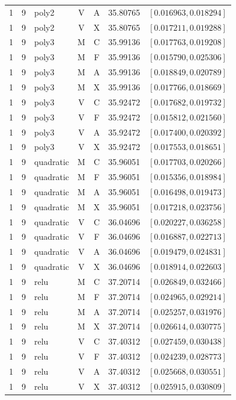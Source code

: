 \begin{longtable}{r r l c c r l}
1 & 9 & poly2 & V & A & 35.80765 & $[0.016963,0.018294]$ \\
1 & 9 & poly2 & V & X & 35.80765 & $[0.017211,0.019288]$ \\
1 & 9 & poly3 & M & C & 35.99136 & $[0.017763,0.019208]$ \\
1 & 9 & poly3 & M & F & 35.99136 & $[0.015790,0.025306]$ \\
1 & 9 & poly3 & M & A & 35.99136 & $[0.018849,0.020789]$ \\
1 & 9 & poly3 & M & X & 35.99136 & $[0.017766,0.018669]$ \\
1 & 9 & poly3 & V & C & 35.92472 & $[0.017682,0.019732]$ \\
1 & 9 & poly3 & V & F & 35.92472 & $[0.015812,0.021560]$ \\
1 & 9 & poly3 & V & A & 35.92472 & $[0.017400,0.020392]$ \\
1 & 9 & poly3 & V & X & 35.92472 & $[0.017553,0.018651]$ \\
1 & 9 & quadratic & M & C & 35.96051 & $[0.017703,0.020266]$ \\
1 & 9 & quadratic & M & F & 35.96051 & $[0.015356,0.018984]$ \\
1 & 9 & quadratic & M & A & 35.96051 & $[0.016498,0.019473]$ \\
1 & 9 & quadratic & M & X & 35.96051 & $[0.017218,0.023756]$ \\
1 & 9 & quadratic & V & C & 36.04696 & $[0.020227,0.036258]$ \\
1 & 9 & quadratic & V & F & 36.04696 & $[0.016887,0.022713]$ \\
1 & 9 & quadratic & V & A & 36.04696 & $[0.019479,0.024831]$ \\
1 & 9 & quadratic & V & X & 36.04696 & $[0.018914,0.022603]$ \\
1 & 9 & relu & M & C & 37.20714 & $[0.026849,0.032466]$ \\
1 & 9 & relu & M & F & 37.20714 & $[0.024965,0.029214]$ \\
1 & 9 & relu & M & A & 37.20714 & $[0.025257,0.031976]$ \\
1 & 9 & relu & M & X & 37.20714 & $[0.026614,0.030775]$ \\
1 & 9 & relu & V & C & 37.40312 & $[0.027459,0.030438]$ \\
1 & 9 & relu & V & F & 37.40312 & $[0.024239,0.028773]$ \\
1 & 9 & relu & V & A & 37.40312 & $[0.025668,0.030551]$ \\
1 & 9 & relu & V & X & 37.40312 & $[0.025915,0.030809]$ \\

\end{longtable}
